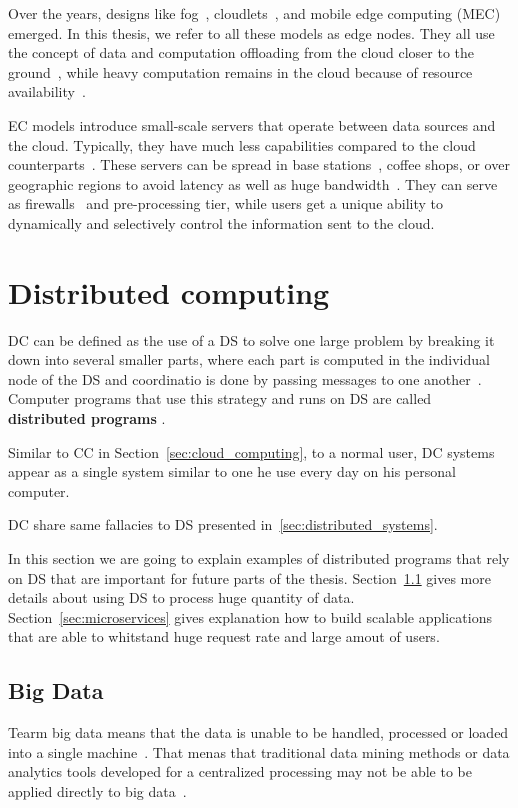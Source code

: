 Over the years, designs like fog~\cite{BonomiMNZ14}, cloudlets~\cite{MonsalveCC18}, and mobile edge computing (MEC)~\cite{WangZZWYW17} emerged. In this thesis, we refer to all these models as edge nodes. They all use the concept of data and computation offloading from the cloud closer to the ground~\cite{KhuneP19}, while heavy computation remains in the cloud because of resource availability~\cite{NingLSY20}. 

EC models introduce small-scale servers that operate between data sources and the cloud. Typically, they have much less capabilities compared to the cloud counterparts~\cite{ChenHLLW15}. These servers can be spread in base stations~\cite{WangZZWYW17}, coffee shops, or over geographic regions to avoid latency as well as huge bandwidth~\cite{MonsalveCC18}. They can serve as firewalls~\cite{SatyanarayananK19} and pre-processing tier, while users get a unique ability to dynamically and selectively control the information sent to the cloud.
%
%
\section{Distributed computing}\label{sec:distributed_computing}
%
DC can be defined as the use of a DS to solve one large problem by breaking it down into several smaller parts, where each part is computed in the individual node of the DS and coordinatio is done by passing messages to one another~\cite{0019513}. Computer programs that use this strategy and runs on DS are called \textbf{distributed programs} \cite{Vera16, andrews2000foundations}. 

Similar to CC in Section~\ref{sec:cloud_computing}, to a normal user, DC systems appear as a single system similar to one he use every day on his personal computer.

DC share same fallacies to DS presented in~\ref{sec:distributed_systems}.

In this section we are going to explain examples of distributed programs that rely on DS that are important for future parts of the thesis. Section~\ref{sec:big_data} gives more details about using DS to process huge quantity of data. Section~\ref{sec:microservices} gives explanation how to build scalable applications that are able to whitstand huge request rate and large amout of users.
%
%
\subsection{Big Data}\label{sec:big_data}
%
Tearm big data means that the data is unable to be handled, processed or loaded into a single machine~\cite{FisherDCD12}. That menas that traditional data mining methods or data analytics tools developed for a centralized processing  may not be able to be applied directly to big data~\cite{Tsai2015}. 

